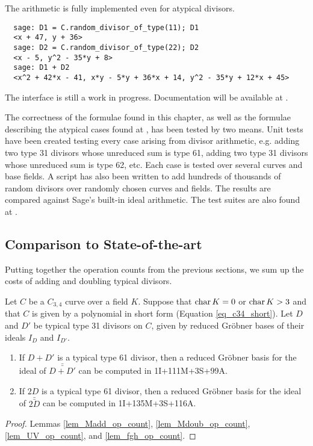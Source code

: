 The arithmetic is fully implemented even for atypical divisors.
\begin{verbatim}
  sage: D1 = C.random_divisor_of_type(11); D1
  <x + 47, y + 36>
  sage: D2 = C.random_divisor_of_type(22); D2
  <x - 5, y^2 - 35*y + 8>
  sage: D1 + D2
  <x^2 + 42*x - 41, x*y - 5*y + 36*x + 14, y^2 - 35*y + 12*x + 45>
\end{verbatim}
The interface is still a work in progress.
Documentation will be available at \cite{github}.

The correctness of the formulae found in this chapter,
as well as the formulae describing the atypical cases found at \cite{github},
has been tested by two means.
Unit tests have been created testing every case arising from divisor arithmetic,
e.g. adding two type 31 divisors whose unreduced sum is type 61,
adding two type 31 divisors whose unreduced sum is type 62, etc.
Each case is tested over several curves and base fields.
A script has also been written to add hundreds of thousands
of random divisors over randomly chosen curves and fields.
The results are compared against Sage's built-in ideal arithmetic.
The test suites are also found at \cite{github}.




\subsection{Comparison to State-of-the-art}

Putting together the operation counts from the previous sections,
we sum up the costs of adding and doubling typical divisors.
\begin{theorem}
  \label{thm_op_count}
  Let $C$ be a $C_{3,4}$ curve over a field $K$.
  Suppose that $\operatorname{char} K = 0$ or $\operatorname{char} K > 3$ and that $C$ is given by a polynomial in short form
  (Equation \ref{eq_c34_short}).
  Let $D$ and $D'$ be typical type 31 divisors on $C$,
  given by reduced Gr\"obner bases of their ideals $I_D$ and $I_{D'}$.
  \begin{enumerate}[label=(\roman*)]
    \item
    If $D + D'$ is a typical type 61 divisor,
    then a reduced Gr\"obner basis for the ideal of $\bar{\bar{D + D'}}$ can be computed in 1I+111M+3S+99A.
    \item
    If $2D$ is a typical type 61 divisor, 
    then a reduced Gr\"obner basis for the ideal of $\bar{\bar {2D}}$ can be computed in 1I+135M+3S+116A.
  \end{enumerate}
\end{theorem}
\begin{proof}
  Lemmas \ref{lem_Madd_op_count}, \ref{lem_Mdoub_op_count}, \ref{lem_UV_op_count}, and \ref{lem_fgh_op_count}.
\end{proof}

